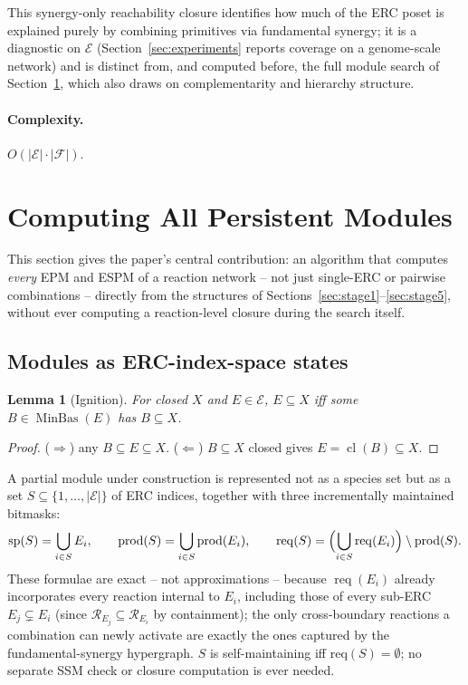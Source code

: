 \documentclass[11pt]{article}
\theoremstyle{plain}
\newtheorem{lemma}{Lemma}
\theoremstyle{remark}
\newcommand{\prods}{\operatorname{prod}}
\newcommand{\cl}{\operatorname{cl}}
\newcommand{\MinBas}{\operatorname{MinBas}}
\newcommand{\req}{\operatorname{req}}
\newcommand{\E}{\mathcal{E}}
\newcommand{\R}{\mathcal{R}}
\begin{document}
This synergy-only reachability closure identifies how much of the ERC
poset is explained purely by combining primitives via fundamental synergy;
it is a diagnostic on $\E$ (Section~\ref{sec:experiments} reports
coverage on a genome-scale network) and is distinct from, and computed
before, the full module search of Section~\ref{sec:grammar}, which also
draws on complementarity and hierarchy structure.

\paragraph{Complexity.} $O(|\E| \cdot |\mathcal{F}|)$.

\section{Computing All Persistent Modules}\label{sec:grammar}

This section gives the paper's central contribution: an algorithm that
computes \emph{every} EPM and ESPM of a reaction network -- not just
single-ERC or pairwise combinations -- directly from the structures of
Sections~\ref{sec:stage1}--\ref{sec:stage5}, without ever computing a
reaction-level closure during the search itself.

\subsection{Modules as ERC-index-space states}

\begin{lemma}[Ignition]
\label{lem:ignition}
For closed $X$ and $E\in\E$, $E\subseteq X$ iff some $B\in\MinBas(E)$ has
$B\subseteq X$.
\end{lemma}
\begin{proof}
($\Rightarrow$) any $B\subseteq E\subseteq X$. ($\Leftarrow$) $B\subseteq X$
closed gives $E=\cl(B)\subseteq X$.
\end{proof}

A partial module under construction is represented not as a species set
but as a set $S\subseteq\{1,\dots,|\E|\}$ of ERC indices, together with
three incrementally maintained bitmasks:
\[
  \mathrm{sp}(S)=\bigcup_{i\in S}E_i,\qquad
  \mathrm{prod}(S)=\bigcup_{i\in S}\prods(E_i),\qquad
  \mathrm{req}(S)=\Bigl(\bigcup_{i\in S}\req(E_i)\Bigr)\setminus\mathrm{prod}(S).
\]
These formulae are exact -- not approximations -- because $\req(E_i)$
already incorporates every reaction internal to $E_i$, including those of
every sub-ERC $E_j\subsetneq E_i$ (since $\R_{E_j}\subseteq\R_{E_i}$ by
containment); the only cross-boundary reactions a combination can newly
activate are exactly the ones captured by the fundamental-synergy
hypergraph. $S$ is self-maintaining iff $\mathrm{req}(S)=\emptyset$; no
separate SSM check or closure computation is ever needed.
\end{document}

